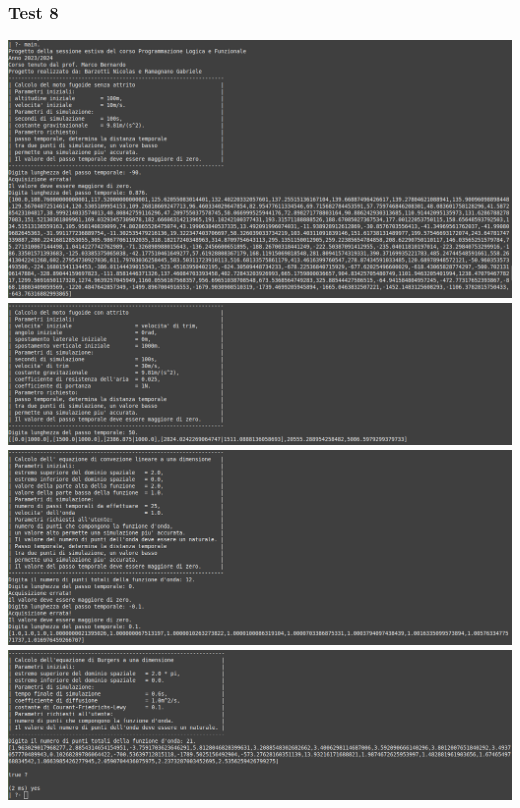 \subsubsection*{Test 8}
\includegraphics[width=\textwidth,height=\textheight,keepaspectratio]{05_testing/image/pro/08_test/01.png}
\\
\includegraphics[width=\textwidth,height=\textheight,keepaspectratio]{05_testing/image/pro/08_test/02.png}
\\
\includegraphics[width=\textwidth,height=\textheight,keepaspectratio]{05_testing/image/pro/08_test/03.png}
\\
\includegraphics[width=\textwidth,height=\textheight,keepaspectratio]{05_testing/image/pro/08_test/04.png}


